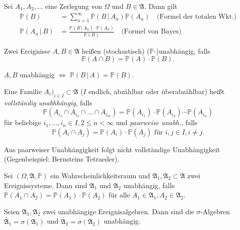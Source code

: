 \documentclass{cheat-sheet}
\newcommand{\Alg}{\mathfrak{A}}
\renewcommand{\P}{\mathbb{P}}
\newcommand{\PD}[2]{\P(#1\,|\,#2)}
\begin{document}


\begin{satz}
  Sei $A_1, A_2, ...$ eine Zerlegung von $\Omega$ und $B \in \Alg$. Dann gilt
  \begin{align*}
    \P(B) &= \sum_{n=1}^\infty \PD{B}{A_n} \P(A_n) \quad \text{(Formel der totalen Wkt.)}\\
    \PD{A_n}{B} &= \frac{\PD{B}{A_n} \cdot \P(A_n)}{\P(B)} \quad \text{(Formel von Bayes)}
  \end{align*}
\end{satz}

\begin{defn}
  Zwei Ereignisse $A, B \in \Alg$ heißen (stochastisch) ($\P$-)unabhängig, falls
  \[ \P(A \cap B) = \P(A) \cdot \P(B). \]
\end{defn}

\begin{satz}
  $A, B$ unabhängig $\iff$ $\PD{B}{A} = \P(B)$.
\end{satz}

\begin{defn}
  Eine Familie $A_i)_{i \in I} \subset \Alg$ ($I$ endlich, abzählbar oder überabzählbar) heißt \emph{vollständig unabhhängig}, falls
  \[ \P(A_{i_1} \cap A_{i_2} \cap ... \cap A_{i_m}) = \P(A_{i_1}) \cdot \P(A_{i_2}) \cdots \P(A_{i_n}) \]
  für beliebige $i_1, ..., i_n \in I, 2 \leq n < \infty$ und \emph{paarweise unabh.}, falls
  \[ \P(A_i \cap A_j) = \P(A_i) \cdot \P(A_j) \text{ für } i, j \in I, i \not= j. \]
\end{defn}

\begin{acht}
  Aus paarweiser Unabhängigkeit folgt nicht vollständige Unabhängigkeit (Gegenbeispiel: Bernsteins Tetraeder).
\end{acht}

\begin{defn}
  Sei $(\Omega, \Alg, \P)$ ein Wahrscheinlichkeitsraum und $\Alg_1, \Alg_2 \subset \Alg$ zwei Ereignissysteme. Dann sind $\Alg_1$ und $\Alg_2$ unabhängig, falls $\P(A_1 \cap A_2) = \P(A_1) \cdot \P(A_2)$ für alle $A_1 \in \Alg_1, A_2 \in \Alg_2$.
\end{defn}

\begin{satz}
  Seien $\Alg_1, \Alg_2$ zwei unabhängige Ereignisalgebren. Dann sind die $\sigma$-Algebren $\tilde{\Alg_1} = \sigma(\Alg_1)$ und $\tilde{\Alg_2} = \sigma(\Alg_2)$ unabhängig.
\end{satz}
\end{document}
